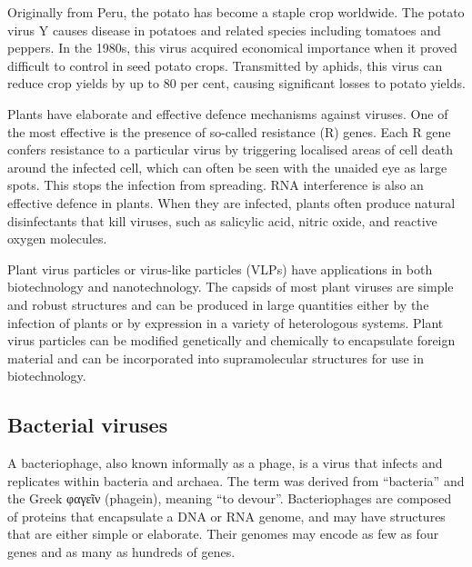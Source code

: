 Originally from Peru, the potato has become a staple crop worldwide. The potato virus Y causes disease in potatoes and related species including tomatoes and peppers. In the 1980s, this virus acquired economical importance when it proved difficult to control in seed potato crops. Transmitted by aphids, this virus can reduce crop yields by up to 80 per cent, causing significant losses to potato yields.

Plants have elaborate and effective defence mechanisms against viruses. One of the most effective is the presence of so-called resistance (R) genes. Each R gene confers resistance to a particular virus by triggering localised areas of cell death around the infected cell, which can often be seen with the unaided eye as large spots. This stops the infection from spreading. RNA interference is also an effective defence in plants. When they are infected, plants often produce natural disinfectants that kill viruses, such as salicylic acid, nitric oxide, and reactive oxygen molecules.

Plant virus particles or virus-like particles (VLPs) have applications in both biotechnology and nanotechnology. The capsids of most plant viruses are simple and robust structures and can be produced in large quantities either by the infection of plants or by expression in a variety of heterologous systems. Plant virus particles can be modified genetically and chemically to encapsulate foreign material and can be incorporated into supramolecular structures for use in biotechnology.

\hypertarget{bacterial-viruses}{%
\subsection{Bacterial viruses}\label{bacterial-viruses}}

A bacteriophage, also known informally as a phage, is a virus that infects and replicates within bacteria and archaea. The term was derived from ``bacteria'' and the Greek φαγεῖν (phagein), meaning ``to devour''. Bacteriophages are composed of proteins that encapsulate a DNA or RNA genome, and may have structures that are either simple or elaborate. Their genomes may encode as few as four genes and as many as hundreds of genes.



